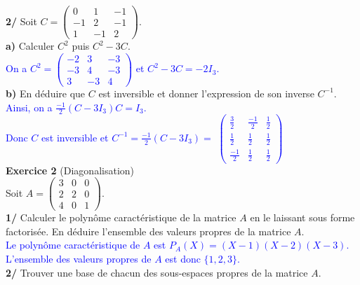 \documentclass[a4paper,12pt]{article}
\begin{document}
\textbf{2/} Soit \( C = \begin{pmatrix}
0 & 1 & -1 \\
-1 & 2 & -1 \\
1 & -1 & 2
\end{pmatrix} \).  \\

\textbf{a)} Calculer $C^2$ puis $C^2-3C$. \\

\textcolor{blue}{On a 
\( C^2 = \begin{pmatrix}
-2 & 3 & -3 \\
-3 & 4 & -3 \\
3 & -3 & 4
\end{pmatrix} \) et $C^2-3C=-2I_3$.} \\

\textbf{b)} En déduire que $C$ est inversible et donner l'expression de son inverse $C^{-1}$. \\

\textcolor{blue}{Ainsi, on a $\frac{-1}{2} (C-3I_3)C = I_3$. \\
Donc $C$ est inversible et $C^{-1} = \frac{-1}{2} (C-3I_3) =$ \( \begin{pmatrix}
\frac{3}{2} & \frac{-1}{2} & \frac{1}{2} \\
\frac{1}{2} & \frac{1}{2} & \frac{1}{2} \\
\frac{-1}{2} & \frac{1}{2} & \frac{1}{2}
\end{pmatrix} \)} \\

\textbf{Exercice 2} (Diagonalisation) \\

Soit \( A = \begin{pmatrix}
3 & 0 & 0 \\
2 & 2 & 0 \\
4 & 0 & 1
\end{pmatrix} \).\\
\textbf{1/} Calculer le polynôme caractéristique de la matrice $A$ en le laissant sous forme factorisée. En déduire l'ensemble des valeurs propres de la matrice $A$. \\

\textcolor{blue}{Le polynôme caractéristique de $A$ est $P_A(X)=(X-1)(X-2)(X-3)$. L'ensemble des valeurs propres de $A$ est donc $\{1,2,3\}$.} \\

\textbf{2/} Trouver une base de chacun des sous-espaces propres de la matrice $A$. \\
\end{document}
